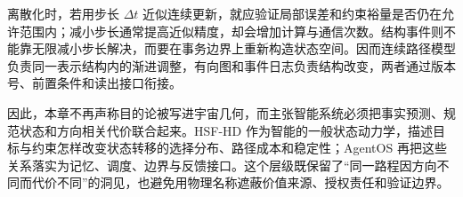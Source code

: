 离散化时，若用步长 $\Delta t$ 近似连续更新，就应验证局部误差和约束裕量是否仍在允许范围内；减小步长通常提高近似精度，却会增加计算与通信次数。结构事件则不能靠无限减小步长解决，而要在事务边界上重新构造状态空间。因而连续路径模型负责同一表示结构内的渐进调整，有向图和事件日志负责结构改变，两者通过版本号、前置条件和读出接口衔接。

因此，本章不再声称目的论被写进宇宙几何，而主张智能系统必须把事实预测、规范状态和方向相关代价联合起来。HSF-HD 作为智能的一般状态动力学，描述目标与约束怎样改变状态转移的选择分布、路径成本和稳定性；AgentOS 再把这些关系落实为记忆、调度、边界与反馈接口。这个层级既保留了“同一路程因方向不同而代价不同”的洞见，也避免用物理名称遮蔽价值来源、授权责任和验证边界。
